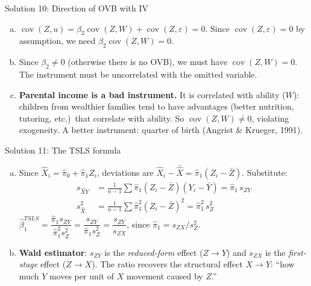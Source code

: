 \documentclass[10pt]{beamer}
\begin{document}
\begin{frame}{Solution 10: Direction of OVB with IV}
\label{s10}
\begin{enumerate}[(a)]
  \item $\operatorname{cov}(Z, u) = \beta_2\operatorname{cov}(Z, W) + \operatorname{cov}(Z, \varepsilon) = 0$. Since $\operatorname{cov}(Z,\varepsilon) = 0$ by assumption, we need $\beta_2\operatorname{cov}(Z, W) = 0$.

  \item Since $\beta_2 \neq 0$ (otherwise there is no OVB), we must have $\operatorname{cov}(Z, W) = 0$. The instrument must be \alert{uncorrelated with the omitted variable}.

  \item \textbf{Parental income is a bad instrument.} It is correlated with ability ($W$): children from wealthier families tend to have advantages (better nutrition, tutoring, etc.)\ that correlate with ability. So $\operatorname{cov}(Z, W) \neq 0$, violating exogeneity. A better instrument: quarter of birth (Angrist \& Krueger, 1991).
\end{enumerate}

\vfill
\hfill\hyperlink{q10}{}
\end{frame}

\begin{frame}{Solution 11: The TSLS formula}
\label{s11}
\begin{enumerate}[(a)]
  \item Since $\widehat{X}_i = \widehat{\pi}_0 + \widehat{\pi}_1 Z_i$, deviations are $\widehat{X}_i - \bar{\widehat{X}} = \widehat{\pi}_1(Z_i - \bar{Z})$. Substitute:
  \begin{align*}
  s_{\widehat{X}Y} &= \frac{1}{n-1}\sum \widehat{\pi}_1(Z_i - \bar{Z})(Y_i - \bar{Y}) = \widehat{\pi}_1 \, s_{ZY} \\
  s_{\widehat{X}}^2 &= \frac{1}{n-1}\sum \widehat{\pi}_1^2(Z_i - \bar{Z})^2 = \widehat{\pi}_1^2 \, s_Z^2
  \end{align*}
  $\widehat{\beta}_1^{TSLS} = \dfrac{\widehat{\pi}_1 s_{ZY}}{\widehat{\pi}_1^2 s_Z^2} = \dfrac{s_{ZY}}{\widehat{\pi}_1 s_Z^2} = \dfrac{s_{ZY}}{s_{ZX}}$, \quad since $\widehat{\pi}_1 = s_{ZX}/s_Z^2$. \checkmark

  \item \textbf{Wald estimator}: $s_{ZY}$ is the \emph{reduced-form} effect ($Z \to Y$) and $s_{ZX}$ is the \emph{first-stage} effect ($Z \to X$). The ratio recovers the structural effect $X \to Y$: ``how much $Y$ moves per unit of $X$ movement caused by $Z$.''
\end{enumerate}

\vfill
\hfill\hyperlink{q11}{}
\end{frame}
\end{document}
